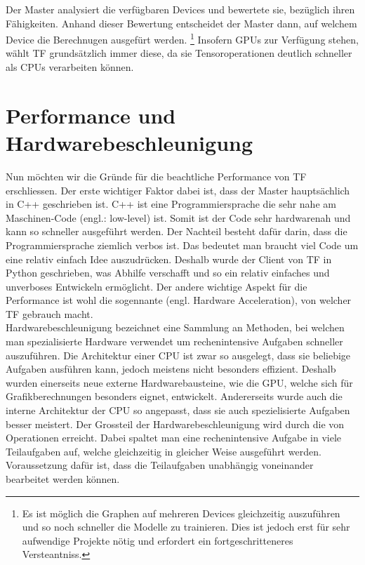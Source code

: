 \begin{appendices}
Der Master analysiert die verfügbaren Devices und bewertete sie, bezüglich
ihren Fähigkeiten. Anhand dieser Bewertung entscheidet der Master dann, auf
welchem Device die Berechnugen ausgefürt werden.
\footnote{
  Es ist möglich die Graphen auf mehreren Devices gleichzeitig auszuführen und
  so noch schneller die Modelle zu trainieren. Dies ist jedoch erst für sehr
  aufwendige Projekte nötig und erfordert ein fortgeschritteneres Versteantniss.
}
Insofern GPUs zur Verfügung stehen, wählt TF grundsätzlich immer diese, da
sie Tensoroperationen deutlich schneller als CPUs verarbeiten können.

\section*{Performance und Hardwarebeschleunigung}
Nun möchten wir die Gründe für die beachtliche Performance von TF erschliessen.
Der erste wichtiger Faktor dabei ist, dass der Master hauptsächlich in C++
geschrieben ist. C++ ist eine Programmiersprache die sehr nahe am Maschinen-Code
(engl.: low-level) ist. Somit ist der Code sehr hardwarenah und kann so
schneller ausgeführt werden. Der Nachteil besteht dafür darin, dass die Programmiersprache
ziemlich verbos ist. Das bedeutet man braucht viel Code um eine relativ einfach Idee
auszudrücken. Deshalb wurde der Client von TF in Python geschrieben, was
Abhilfe verschafft und so ein relativ einfaches und unverboses Entwickeln ermöglicht.
\para{}
Der andere wichtige Aspekt für die Performance ist wohl die sogennante
 (engl. Hardware Acceleration), von welcher TF
gebrauch macht. \\
Hardwarebeschleunigung bezeichnet eine Sammlung an Methoden,
bei welchen man spezialisierte Hardware verwendet um rechenintensive Aufgaben
schneller auszuführen. Die Architektur einer CPU ist zwar so ausgelegt, dass
sie beliebige Aufgaben ausführen kann, jedoch meistens nicht besonders
effizient. Deshalb wurden einerseits neue externe Hardwarebausteine, wie die
GPU, welche sich für Grafikberechnungen besonders eignet, entwickelt.
Andererseits wurde auch die interne Architektur der CPU so angepasst, dass sie
auch spezielisierte Aufgaben besser meistert.
\para{}
Der Grossteil der Hardwarebeschleunigung wird durch die
 von Operationen erreicht. Dabei spaltet man eine
rechenintensive Aufgabe in viele Teilaufgaben auf, welche gleichzeitig in
gleicher Weise ausgeführt werden. Voraussetzung dafür ist, dass die
Teilaufgaben unabhängig voneinander bearbeitet werden können. \\

\end{appendices}
